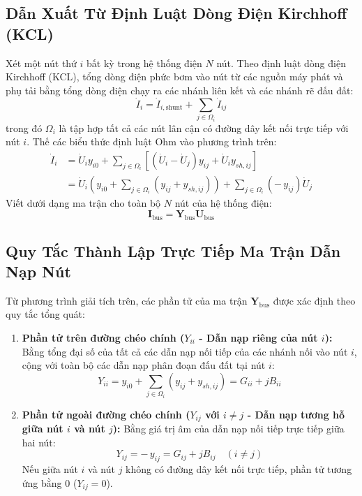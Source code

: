 \documentclass[12pt,a4paper,oneside]{report}
\begin{document}
\subsection{Dẫn Xuất Từ Định Luật Dòng Điện Kirchhoff (KCL)}
Xét một nút thứ $i$ bất kỳ trong hệ thống điện $N$ nút. Theo định luật dòng điện Kirchhoff (KCL), tổng dòng điện phức bơm vào nút từ các nguồn máy phát và phụ tải bằng tổng dòng điện chạy ra các nhánh liên kết và các nhánh rẽ đấu đất:
\begin{equation}
\dot{I}_i = \dot{I}_{i,\text{shunt}} + \sum_{j \in \Omega_i} \dot{I}_{ij}
\end{equation}
trong đó $\Omega_i$ là tập hợp tất cả các nút lân cận có đường dây kết nối trực tiếp với nút $i$. Thế các biểu thức định luật Ohm vào phương trình trên:
\begin{align}
\dot{I}_i &= \dot{U}_i y_{i0} + \sum_{j \in \Omega_i} \left[ (\dot{U}_i - \dot{U}_j) y_{ij} + \dot{U}_i y_{sh,ij} \right] \\
&= \dot{U}_i \left( y_{i0} + \sum_{j \in \Omega_i} (y_{ij} + y_{sh,ij}) \right) + \sum_{j \in \Omega_i} (-\, y_{ij}) \dot{U}_j
\end{align}
Viết dưới dạng ma trận cho toàn bộ $N$ nút của hệ thống điện:
\begin{equation}
\mathbf{I}_{\text{bus}} = \mathbf{Y}_{\text{bus}} \mathbf{U}_{\text{bus}}
\end{equation}

\subsection{Quy Tắc Thành Lập Trực Tiếp Ma Trận Dẫn Nạp Nút}
Từ phương trình giải tích trên, các phần tử của ma trận $\mathbf{Y}_{\text{bus}}$ được xác định theo quy tắc tổng quát:
\begin{enumerate}
    \item \textbf{Phần tử trên đường chéo chính ($Y_{ii}$ - Dẫn nạp riêng của nút $i$):} Bằng tổng đại số của tất cả các dẫn nạp nối tiếp của các nhánh nối vào nút $i$, cộng với toàn bộ các dẫn nạp phân đoạn đấu đất tại nút $i$:
    \begin{equation}
    Y_{ii} = y_{i0} + \sum_{j \in \Omega_i} (y_{ij} + y_{sh,ij}) = G_{ii} + jB_{ii}
    \end{equation}
    \item \textbf{Phần tử ngoài đường chéo chính ($Y_{ij}$ với $i \ne j$ - Dẫn nạp tương hỗ giữa nút $i$ và nút $j$):} Bằng giá trị âm của dẫn nạp nối tiếp trực tiếp giữa hai nút:
    \begin{equation}
    Y_{ij} = -\, y_{ij} = G_{ij} + jB_{ij} \quad (i \ne j)
    \end{equation}
    Nếu giữa nút $i$ và nút $j$ không có đường dây kết nối trực tiếp, phần tử tương ứng bằng $0$ ($Y_{ij} = 0$).
\end{enumerate}
\end{document}
